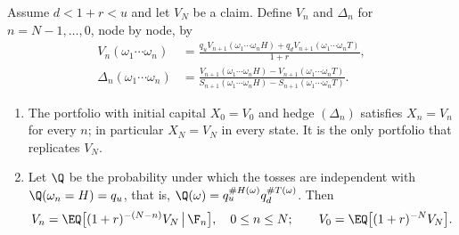 \begin{theorem}\label{thm:bin-multi-period}
Assume $d<1+r<u$ and let $V_N$ be a claim. Define $V_n$ and $\Delta_n$ for
$n=N-1,\dots,0$, node by node, by
\begin{align}
  V_n(\omega_1\cdots\omega_n)&=\frac{q_uV_{n+1}(\omega_1\cdots\omega_nH)+q_dV_{n+1}(\omega_1\cdots\omega_nT)}{1+r},
  \label{eq:bin-backward}\\
  \Delta_n(\omega_1\cdots\omega_n)&=\frac{V_{n+1}(\omega_1\cdots\omega_nH)-V_{n+1}(\omega_1\cdots\omega_nT)}
  {S_{n+1}(\omega_1\cdots\omega_nH)-S_{n+1}(\omega_1\cdots\omega_nT)}.\label{eq:bin-delta}
\end{align}
\begin{enumerate}[label=(\roman*)]
  \item The portfolio with initial capital $X_0=V_0$ and hedge $(\Delta_n)$ satisfies
    $X_n=V_n$ for every $n$; in particular $X_N=V_N$ in every state. It is the only
    portfolio that replicates $V_N$.
  \item Let $\Q$ be the probability under which the tosses are independent with
    $\Q(\omega_n=H)=q_u$, that is, $\Q(\omega)=q_u^{\#H(\omega)}q_d^{\#T(\omega)}$. Then
    \begin{equation}\label{eq:bin-price}
      V_n=\EQ\big[(1+r)^{-(N-n)}V_N\,\big|\,\F_n\big],\quad 0\le n\le N;\qquad
      V_0=\EQ\big[(1+r)^{-N}V_N\big].
    \end{equation}
\end{enumerate}
\end{theorem}


